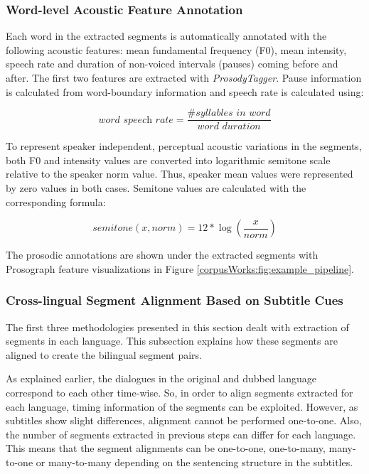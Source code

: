 \subsubsection*{Word-level Acoustic Feature Annotation}

Each word in the extracted segments is automatically annotated with the following acoustic features: mean fundamental frequency (F0), mean intensity, speech rate and duration of non-voiced intervals (pauses) coming before and after. The first two features are extracted with \textit{ProsodyTagger}. Pause information is calculated from word-boundary information and speech rate is calculated using:

\begin{equation}
  \textit{word speech rate} = {\dfrac{\textit{\# syllables in word}}{\textit{word duration}}}
  \label{sprate}
\end{equation}

To represent speaker independent, perceptual acoustic variations in the segments, both F0 and intensity values are converted into logarithmic semitone scale relative to the speaker norm value. Thus, speaker mean values were represented by zero values in both cases. Semitone values are calculated with the corresponding formula:

\begin{equation}
  \textit{semitone}(x, \textit{norm}) = 12 * \log (\dfrac{x}{\textit{norm}})
  \label{semitone}
\end{equation}

The prosodic annotations are shown under the extracted segments with Prosograph feature visualizations in Figure \ref{corpusWorks:fig:example_pipeline}.

\subsubsection*{Cross-lingual Segment Alignment Based on Subtitle Cues}
\label{subsec:alignment}
The first three methodologies presented in this section dealt with extraction of segments in each language. This subsection explains how these segments are aligned to create the bilingual segment pairs. 

As explained earlier, the dialogues in the original and dubbed language correspond to each other time-wise. So, in order to align segments extracted for each language, timing information of the segments can be exploited. However, as subtitles show slight differences, alignment cannot be performed one-to-one. Also, the number of segments extracted in previous steps can differ for each language. This means that the segment alignments can be one-to-one, one-to-many, many-to-one or many-to-many depending on the sentencing structure in the subtitles. 

